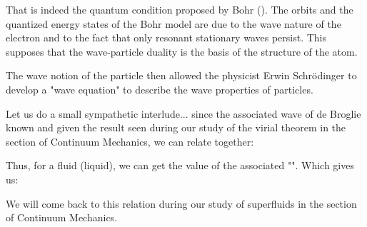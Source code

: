 	That is indeed the quantum condition proposed by Bohr (). The orbits and the quantized energy states of the Bohr model are due to the wave nature of the electron and to the fact that only resonant stationary waves persist. This supposes that the wave-particle duality is the basis of the structure of the atom.

	The wave notion of the particle then allowed the physicist Erwin Schrödinger to develop a "wave equation" to describe the wave properties of particles.

	Let us do a small sympathetic interlude... since the associated wave of de Broglie known and given the result seen during our study of the virial theorem in the section of Continuum Mechanics, we can relate together:
	
	Thus, for a fluid (liquid), we can get the value of the associated "". Which gives us:
	
	We will come back to this relation during our study of superfluids in the section of Continuum Mechanics. 
	
